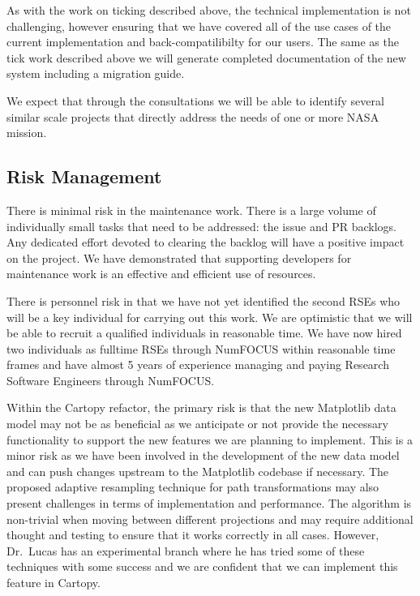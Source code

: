 \documentclass[12pt]{article}
\numberwithin{page}{section}
\begin{document}
As with the work on ticking described above, the technical implementation is not
challenging, however ensuring that we have covered all of the use cases of the current
implementation and back-compatilibilty for our users.  The same as the tick work described above
we will generate completed documentation of the new system including a migration guide.

We expect that through the consultations we will be able to identify several
similar scale projects that directly address the needs of one or more NASA
mission.

\subsection{Risk Management}

There is minimal risk in the maintenance work.  There is a large volume
of individually small tasks that need to be addressed: the issue and
PR backlogs.  Any dedicated effort devoted to clearing the backlog
will have a positive impact on the project.  We have demonstrated that
supporting developers for maintenance work is an effective and
efficient use of resources.


There is personnel risk in that we have not yet identified the second RSEs who
will be a key individual for carrying out this work.  We are optimistic that we
will be able to recruit a qualified individuals in reasonable time.  We have
now hired two individuals as fulltime RSEs through NumFOCUS within reasonable
time frames and have almost 5 years of experience managing and paying
Research Software Engineers through NumFOCUS.


Within the Cartopy refactor, the primary risk is that the new Matplotlib data
model may not be as beneficial as we anticipate or not provide the necessary
functionality to support the new features we are planning to implement. This is
a minor risk as we have been involved in the development of the new data model
and can push changes upstream to the Matplotlib codebase if necessary.
The proposed adaptive resampling technique for path transformations may also
present challenges in terms of implementation and performance. The algorithm
is non-trivial when moving between different projections and may require additional
thought and testing to ensure that it works correctly in all cases.
However, Dr.\ Lucas has an experimental branch where he has tried some of these
techniques with some success and we are confident that we can implement this
feature in Cartopy.
\end{document}
